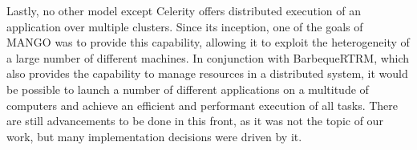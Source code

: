 Lastly, no other model except Celerity offers distributed execution of an application over multiple clusters. Since its inception, one of the goals of MANGO was to provide this capability, allowing it to exploit the heterogeneity of a large number of different machines. In conjunction with BarbequeRTRM, which also provides the capability to manage resources in a distributed system, it would be possible to launch a number of different applications on a multitude of computers and achieve an efficient and performant execution of all tasks. There are still advancements to be done in this front, as it was not the topic of our work, but many implementation decisions were driven by it.